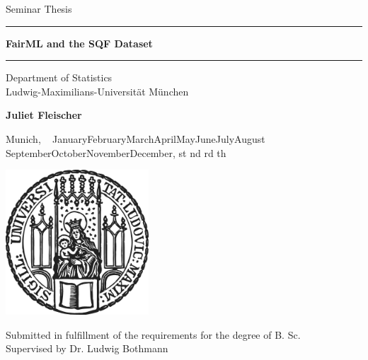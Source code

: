 \documentclass[12pt]{article}
\newcommand{\mytitle}{FairML and the SQF Dataset}
\newcommand{\myname}{\large Juliet Fleischer}
\newcommand{\mysupervisor}{Dr. Ludwig Bothmann}
\newcommand{\thesuffix}[1]{%
  \ifnum#1=1 st%
  \else\ifnum#1=2 nd%
  \else\ifnum#1=3 rd%
  \else th%
  \fi\fi\fi}
\newcommand{\mydate}{%
  ~\ifcase\month\or
  January\or February\or March\or April\or May\or June\or July\or August\or
  September\or October\or November\or December\fi, \the\day\thesuffix{\day} \number\year}
\begin{document}
 
\begin{titlepage}
\begin{center}
    
\LARGE
Seminar Thesis

\vspace{0.5cm}
      
\rule{\textwidth}{1.5pt}
\LARGE
\textbf{\mytitle}
\rule{\textwidth}{1.5pt}
   
\vspace{0.5cm}
      
\large
Department of Statistics \\
Ludwig-Maximilians-Universität München

\vfill

\Large
\textbf{\myname}

\vfill

\large

Munich, \mydate
      
\vfill

\includegraphics[width = 0.4\textwidth]{../figures/sigillum.png}

\vfill

\normalsize
Submitted in fulfillment of the requirements for the degree of B. Sc.
\\
Supervised by \mysupervisor

\end{center}
\end{titlepage}

\end{document}
